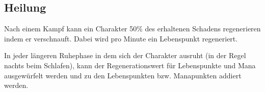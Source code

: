 \documentclass[../../Heldenanleitung2]{subfiles}
\begin{document}
\subsection{Heilung}
Nach einem Kampf kann ein Charakter 50\% des erhaltenen Schadens regenerieren indem er verschnauft. Dabei wird pro Minute ein Lebenspunkt regeneriert.

In jeder längeren Ruhephase in dem sich der Charakter ausruht (in der Regel nachts beim Schlafen), kann der Regenerationswert für Lebenspunkte und Mana ausgewürfelt werden und zu den Lebenspunkten bzw. Manapunkten addiert werden.
\end{document}
